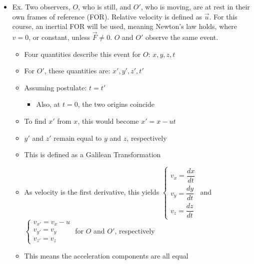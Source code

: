 \begin{itemize}
\begin{itemize}
      \item Ex. Two observers, $O$, who is still, and $O'$, who is moving, are at rest in their own frames of reference (FOR). Relative velocity is defined as $\overrightarrow{u}$. For this course, an inertial FOR will be used, meaning Newton's law holds, where $v=0$, or constant, unless $\overrightarrow{F}\neq0$. $O$ and $O'$ observe the same event.

        \begin{itemize}

          \item Four quantities describe this event for $O$: $x,y,z,t$

          \item For $O'$, these quantities are: $x',y',z',t'$

          \item Assuming postulate: $t=t'$

            \begin{itemize}

              \item Also, at $t=0$, the two origins coincide

            \end{itemize}

          \item To find $x'$ from $x$, this would become $x'= x - ut$

          \item $y'$ and $z'$ remain equal to $y$ and $z$, respectively

          \item This is defined as a Galilean Transformation

          \item As velocity is the first derivative, this yields $\left\{\begin{array}{c} v_x = \dfrac{dx}{dt}\\v_y = \dfrac{dy}{dt}\\ v_z=\dfrac{dz}{dt}\end{array}$ and $\left\{\begin{array}{c} v_{x'} = v_x-u\\v_{y'} = v_y\\ v_{z'}=v_z\end{array}$ for $O$ and $O'$, respectively

                \vspace{10pt}

          \item This means the acceleration components are all equal


\end{itemize}
\end{itemize}
\end{itemize}
